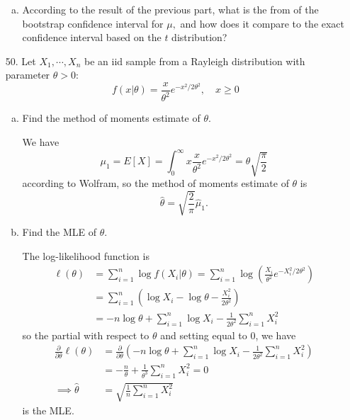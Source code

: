 \documentclass{article}
\begin{document}
\begin{itemize}
\begin{enumerate}[a.]
			\item According to the result of the previous part, what is the from of the bootstrap confidence interval for $\mu,$ and how does it compare to the exact confidence interval based on the $t$ distribution?
				
		\end{enumerate}

	\item[50.] Let $X_1,\cdots, X_n$ be an iid sample from a Rayleigh distribution with parameter $\theta>0$:\[f(x|\theta)=\frac{x}{\theta^2}e^{-x^2/2\theta^2}, \quad x\ge 0\]

		\begin{enumerate}[a.]
			\item Find the method of moments estimate of $\theta.$
				\begin{soln}
					We have \[\mu_1=E[X] = \int_0^\infty x\frac{x}{\theta^2}e^{-x^2/2\theta^2} = \theta\sqrt{\frac{\pi}{2}}\] according to Wolfram, so the method of moments estimate of $\theta$ is \[\hat{\theta}=\sqrt{\frac{2}{\pi}}\hat{\mu}_1.\]

				\end{soln}

			\item Find the MLE of $\theta.$
				\begin{soln}
					The log-likelihood function is 
					\begin{align*}
						\ell(\theta) &= \sum_{i=1}^{n} \log f(X_i|\theta)=\sum_{i=1}^{n}\log\left( \frac{X_i}{\theta^2}e^{-X_i^2/2\theta^2} \right) \\
						&= \sum_{i=1}^{n} \left( \log X_i - \log \theta - \frac{X_i^2}{2\theta^2} \right) \\
						&= -n\log \theta + \sum_{i=1}^{n} \log X_i - \frac{1}{2\theta^2}\sum_{i=1}^{n} X_i^2
					\end{align*} so the partial with respect to $\theta$ and setting equal to 0, we have
					\begin{align*}
						\frac{\partial}{\partial\theta}\ell(\theta) &= \frac{\partial}{\partial\theta}\left( -n\log \theta + \sum_{i=1}^{n} \log X_i - \frac{1}{2\theta^2}\sum_{i=1}^{n} X_i^2\right) \\
						&= -\frac{n}{\theta} + \frac{1}{\theta^3}\sum_{i=1}^{n}X_i^2 = 0 \\
						\implies \hat{\theta} &= \sqrt{\frac{1}{n}\sum_{i=1}^{n}X_i^2}
					\end{align*} is the MLE.
					
				\end{soln}


\end{enumerate}
\end{itemize}
\end{document}
